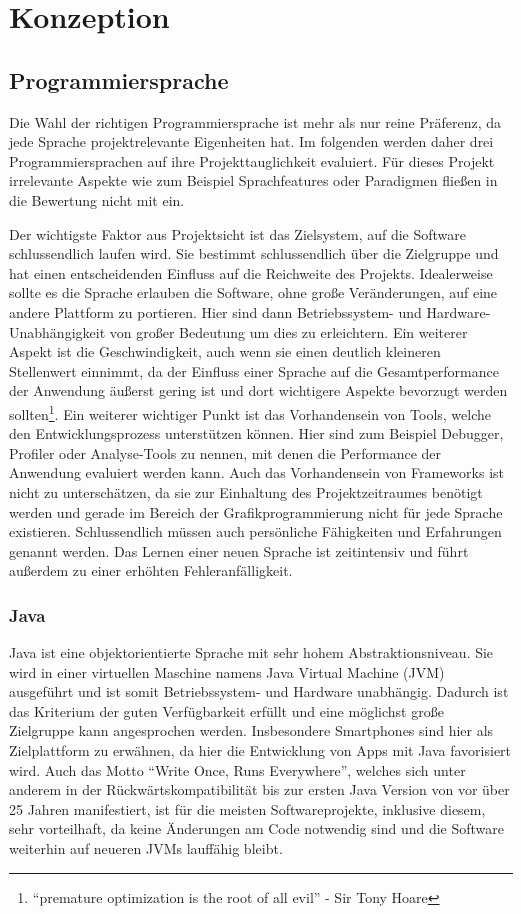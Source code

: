 \chapter{Konzeption}

\section{Programmiersprache}
Die Wahl der richtigen Programmiersprache ist mehr als nur reine Präferenz, da jede Sprache projektrelevante Eigenheiten hat. Im folgenden werden daher drei Programmiersprachen auf ihre Projekttauglichkeit evaluiert. Für dieses Projekt irrelevante Aspekte wie zum Beispiel Sprachfeatures oder Paradigmen fließen in die Bewertung nicht mit ein.

Der wichtigste Faktor aus Projektsicht ist das Zielsystem, auf die Software schlussendlich laufen wird. Sie bestimmt schlussendlich über die Zielgruppe und hat einen entscheidenden Einfluss auf die Reichweite des Projekts. Idealerweise sollte es die Sprache erlauben die Software, ohne große Veränderungen, auf eine andere Plattform zu portieren. Hier sind dann Betriebssystem- und Hardware-Unabhängigkeit von großer Bedeutung um dies zu erleichtern. Ein weiterer Aspekt ist die Geschwindigkeit, auch wenn sie einen deutlich kleineren Stellenwert einnimmt, da der Einfluss einer Sprache auf die Gesamtperformance der Anwendung äußerst gering ist und dort wichtigere Aspekte bevorzugt werden sollten\footnote{“premature optimization is the root of all evil” - Sir Tony Hoare}. Ein weiterer wichtiger Punkt ist das Vorhandensein von Tools, welche den Entwicklungsprozess unterstützen können. Hier sind zum Beispiel Debugger, Profiler oder Analyse-Tools zu nennen, mit denen die Performance der Anwendung evaluiert werden kann. Auch das Vorhandensein von Frameworks ist nicht zu unterschätzen, da sie zur Einhaltung des Projektzeitraumes benötigt werden und gerade im Bereich der Grafikprogrammierung nicht für jede Sprache existieren. Schlussendlich müssen auch persönliche Fähigkeiten und Erfahrungen genannt werden. Das Lernen einer neuen Sprache ist zeitintensiv und führt außerdem zu einer erhöhten Fehleranfälligkeit.

\subsection{Java}
Java ist eine objektorientierte Sprache mit sehr hohem Abstraktionsniveau. Sie wird in einer virtuellen Maschine namens Java Virtual Machine (JVM) ausgeführt und ist somit Betriebssystem- und Hardware unabhängig. Dadurch ist das Kriterium der guten Verfügbarkeit erfüllt und eine möglichst große Zielgruppe kann angesprochen werden. Insbesondere Smartphones sind hier als Zielplattform zu erwähnen, da hier die Entwicklung von Apps mit Java favorisiert wird. Auch das Motto “Write Once, Runs Everywhere”, welches sich unter anderem in der Rückwärtskompatibilität bis zur ersten Java Version von vor über 25 Jahren manifestiert, ist für die meisten Softwareprojekte, inklusive diesem, sehr vorteilhaft, da keine Änderungen am Code notwendig sind und die Software weiterhin auf neueren JVMs lauffähig bleibt.

